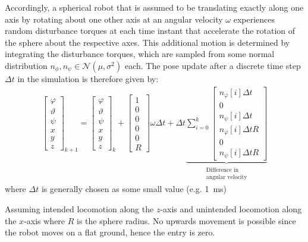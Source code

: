 \documentclass[5p]{elsarticle}
\begin{document}
Accordingly, a spherical robot that is assumed to be translating exactly along one axis by rotating about one other axis at an angular velocity $\omega$  experiences random disturbance torques at each time instant that accelerate the rotation of the sphere about the respective axes. 
This additional motion is determined by integrating the disturbance torques, which are sampled from some normal distribution $n_\phi, n_\psi \in \mathcal{N}(\mu,\sigma^2)$ each.  
The pose update after a discrete time step $\Delta t$ in the simulation is therefore given by: 
\begin{align}
	\begin{bmatrix}\varphi\\\vartheta\\\psi\\x\\y\\z\end{bmatrix}_{k+1} = 
	\begin{bmatrix}\varphi\\\vartheta\\\psi\\x\\y\\z\end{bmatrix}_{k} 
	+ \begin{bmatrix}1\\0\\0\\0\\0\\R\end{bmatrix}\omega \Delta t  + \Delta t \underbrace{\sum_{i = 0}^k \begin{bmatrix}n_\varphi[i] \Delta t\\0\\n_\psi[i]\Delta t\\n_\varphi[i] \Delta t R\\0\\n_\psi[i]\Delta tR\end{bmatrix}}_{\substack{\text{Difference in}\\\text{angular velocity}}}
\end{align}
where $\Delta t$ is generally chosen as some small value (e.g. \SI{1}{\milli\second})

Assuming intended locomotion along the $z$-axis and unintended locomotion along the $x$-axis where $R$ is the sphere radius.
No upwards movement is possible since the robot moves on a flat ground, hence the entry is zero.
\end{document}
